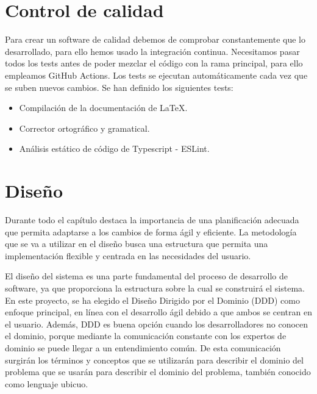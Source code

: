 \section{Control de calidad}
Para crear un software de calidad debemos de comprobar constantemente que lo desarrollado, para ello hemos usado la integración continua.
Necesitamos pasar todos los tests antes de poder mezclar el código con la rama principal, para ello empleamos GitHub Actions.
Los tests se ejecutan automáticamente cada vez que se suben nuevos cambios. Se han definido los siguientes tests:

\begin{itemize}
    \item{Compilación de la documentación de LaTeX.}
    \item{Corrector ortográfico y gramatical.}
    \item{Análisis estático de código de Typescript - ESLint.}
\end{itemize}

\section{Diseño}
Durante todo el capítulo destaca la importancia de una planificación adecuada que permita adaptarse a los cambios de forma ágil y eficiente.
La metodología que se va a utilizar en el diseño busca una estructura que permita una implementación flexible y centrada en las necesidades del usuario.

El diseño del sistema es una parte fundamental del proceso de desarrollo de software, ya que proporciona la estructura sobre la cual se construirá el sistema.
En este proyecto, se ha elegido el Diseño Dirigido por el Dominio (DDD) \cite{domain-drive-design} como enfoque principal, en línea con el desarrollo ágil debido a que ambos se centran en el usuario.
Además, DDD es buena opción cuando los desarrolladores no conocen el dominio, porque mediante la comunicación constante con los expertos de dominio se puede llegar a un entendimiento común.
De esta comunicación surgirán los términos y conceptos que se utilizarán para describir el dominio del problema que se usarán para describir el dominio del problema, también conocido como lenguaje ubicuo.

